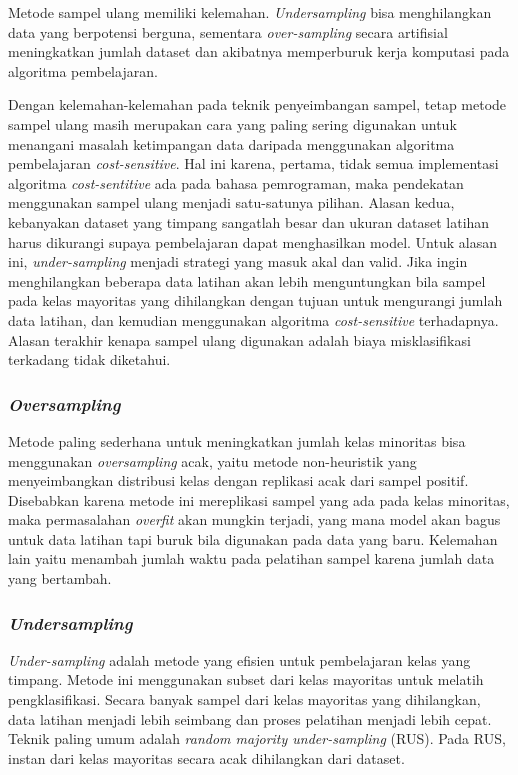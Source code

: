 Metode sampel ulang memiliki kelemahan.
\textit{Undersampling} bisa menghilangkan data yang berpotensi berguna,
sementara \textit{over-sampling} secara artifisial meningkatkan jumlah dataset
dan akibatnya memperburuk kerja komputasi pada algoritma pembelajaran.

Dengan kelemahan-kelemahan pada teknik penyeimbangan sampel, tetap metode
sampel ulang masih merupakan cara yang paling sering digunakan untuk menangani
masalah ketimpangan data daripada menggunakan algoritma pembelajaran
\textit{cost-sensitive}.
Hal ini karena, pertama, tidak semua implementasi algoritma
\textit{cost-sentitive} ada pada bahasa pemrograman, maka pendekatan
menggunakan sampel ulang menjadi satu-satunya pilihan.
Alasan kedua, kebanyakan dataset yang timpang sangatlah besar dan ukuran
dataset latihan harus dikurangi supaya pembelajaran dapat menghasilkan model.
Untuk alasan ini, \textit{under-sampling} menjadi strategi yang masuk akal dan
valid.
Jika ingin menghilangkan beberapa data latihan akan lebih menguntungkan bila
sampel pada kelas mayoritas yang dihilangkan dengan tujuan untuk mengurangi
jumlah data latihan, dan kemudian menggunakan algoritma \textit{cost-sensitive}
terhadapnya.
Alasan terakhir kenapa sampel ulang digunakan adalah biaya misklasifikasi
terkadang tidak diketahui.

\subsubsection{\textit{Oversampling}}\label{subsubsec:oversampling}

Metode paling sederhana untuk meningkatkan jumlah kelas minoritas bisa
menggunakan \textit{oversampling} acak, yaitu metode non-heuristik yang
menyeimbangkan distribusi kelas dengan replikasi acak dari sampel positif.
Disebabkan karena metode ini mereplikasi sampel yang ada pada kelas minoritas,
maka permasalahan \textit{overfit} akan mungkin terjadi, yang mana model akan
bagus untuk data latihan tapi buruk bila digunakan pada data yang baru.
Kelemahan lain yaitu menambah jumlah waktu pada pelatihan sampel karena jumlah
data yang bertambah.

\label{subsubsec:undersampling}
\subsubsection{\textit{Undersampling}}

\textit{Under-sampling} adalah metode yang efisien untuk pembelajaran kelas
yang timpang.
Metode ini menggunakan subset dari kelas mayoritas untuk melatih
pengklasifikasi.  Secara banyak sampel dari kelas mayoritas yang dihilangkan,
data latihan menjadi lebih seimbang dan proses pelatihan menjadi lebih cepat.
Teknik paling umum adalah \textit{random majority under-sampling} (RUS).  Pada
RUS, instan dari kelas mayoritas secara acak dihilangkan dari dataset.

